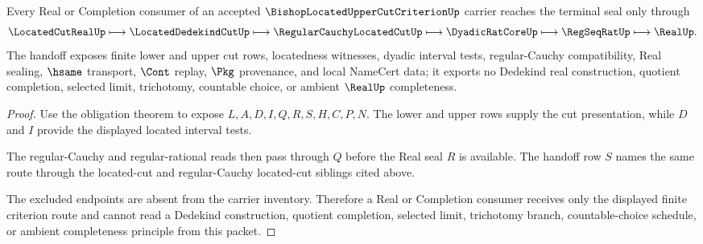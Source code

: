 \begin{theorem}
\label{thm:bishop-located-upper-cut-criterion-real-seal-handoff}
Every Real or Completion consumer of an accepted $\BishopLocatedUpperCutCriterionUp$ carrier reaches the terminal seal only through
$$
\LocatedCutRealUp \longmapsto \LocatedDedekindCutUp \longmapsto \RegularCauchyLocatedCutUp \longmapsto \DyadicRatCoreUp \longmapsto \RegSeqRatUp \longmapsto \RealUp .
$$
The handoff exposes finite lower and upper cut rows, locatedness witnesses, dyadic interval tests, regular-Cauchy compatibility, Real sealing, $\hsame$ transport, $\Cont$ replay, $\Pkg$ provenance, and local NameCert data; it exports no Dedekind real construction, quotient completion, selected limit, trichotomy, countable choice, or ambient $\RealUp$ completeness.
\end{theorem}
\begin{proof}
Use the obligation theorem to expose $L,A,D,I,Q,R,S,H,C,P,N$. The lower and upper rows supply the cut presentation, while $D$ and $I$ provide the displayed located interval tests.

The regular-Cauchy and regular-rational reads then pass through $Q$ before the Real seal $R$ is available. The handoff row $S$ names the same route through the located-cut and regular-Cauchy located-cut siblings cited above.

The excluded endpoints are absent from the carrier inventory. Therefore a Real or Completion consumer receives only the displayed finite criterion route and cannot read a Dedekind construction, quotient completion, selected limit, trichotomy branch, countable-choice schedule, or ambient completeness principle from this packet.
\end{proof}



